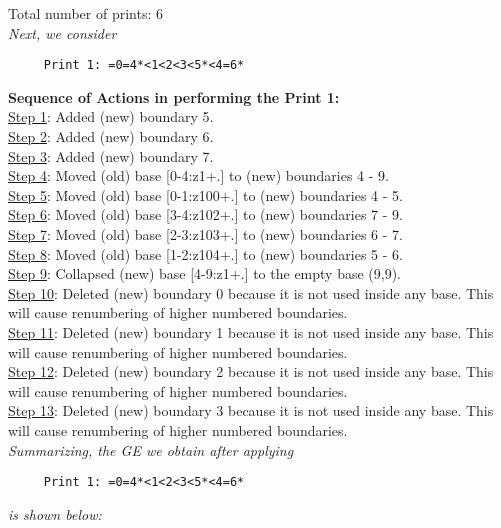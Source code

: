 \documentclass[final]{article}
\begin{document}
Total number of prints: 6\\
{\em Next, we consider}
\begin{verbatim}
     Print 1: =0=4*<1<2<3<5*<4=6*
\end{verbatim}
{\bf Sequence of Actions in performing the Print 1:}\\
{\underline{Step 1}:} Added (new) boundary 5.\\
{\underline{Step 2}:} Added (new) boundary 6.\\
{\underline{Step 3}:} Added (new) boundary 7.\\
{\underline{Step 4}:} Moved (old) base [0-4:z1+.]  to (new) boundaries 4 - 9.\\
{\underline{Step 5}:} Moved (old) base [0-1:z100+.]  to (new) boundaries 4 - 5.\\
{\underline{Step 6}:} Moved (old) base [3-4:z102+.]  to (new) boundaries 7 - 9.\\
{\underline{Step 7}:} Moved (old) base [2-3:z103+.]  to (new) boundaries 6 - 7.\\
{\underline{Step 8}:} Moved (old) base [1-2:z104+.]  to (new) boundaries 5 - 6.\\
{\underline{Step 9}:} Collapsed (new) base [4-9:z1+.]  to the empty base (9,9).
\\
{\underline{Step 10}:} Deleted (new) boundary 0 because it is not used inside any base.  This will cause renumbering of higher numbered boundaries.
\\
{\underline{Step 11}:} Deleted (new) boundary 1 because it is not used inside any base.  This will cause renumbering of higher numbered boundaries.
\\
{\underline{Step 12}:} Deleted (new) boundary 2 because it is not used inside any base.  This will cause renumbering of higher numbered boundaries.
\\
{\underline{Step 13}:} Deleted (new) boundary 3 because it is not used inside any base.  This will cause renumbering of higher numbered boundaries.
\\[0.1in]
{\em Summarizing, the GE we obtain after applying}
\begin{verbatim}
     Print 1: =0=4*<1<2<3<5*<4=6*
\end{verbatim}
{\em is shown below:}
\end{document}
